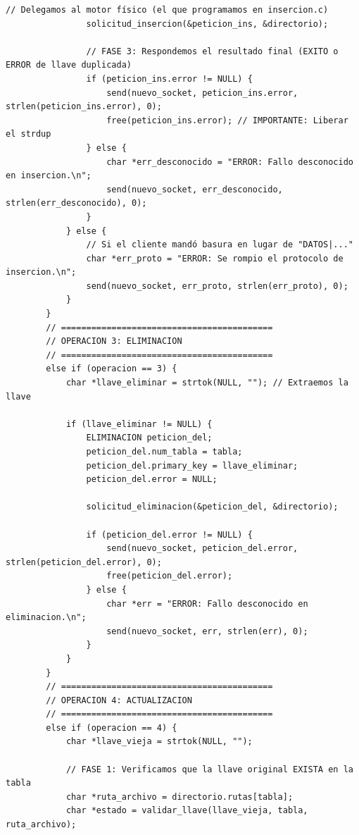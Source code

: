 \documentclass[12pt]{article}
\begin{document}
\begin{lstlisting}[style=estiloC ,title={Código 1. Servidor TCP (MAIN)}]
                // Delegamos al motor físico (el que programamos en insercion.c)
                solicitud_insercion(&peticion_ins, &directorio);

                // FASE 3: Respondemos el resultado final (EXITO o ERROR de llave duplicada)
                if (peticion_ins.error != NULL) {
                    send(nuevo_socket, peticion_ins.error, strlen(peticion_ins.error), 0);
                    free(peticion_ins.error); // IMPORTANTE: Liberar el strdup
                } else {
                    char *err_desconocido = "ERROR: Fallo desconocido en insercion.\n";
                    send(nuevo_socket, err_desconocido, strlen(err_desconocido), 0);
                }
            } else {
                // Si el cliente mandó basura en lugar de "DATOS|..."
                char *err_proto = "ERROR: Se rompio el protocolo de insercion.\n";
                send(nuevo_socket, err_proto, strlen(err_proto), 0);
            }
        }
        // ==========================================
        // OPERACION 3: ELIMINACION
        // ==========================================
        else if (operacion == 3) {
            char *llave_eliminar = strtok(NULL, ""); // Extraemos la llave
            
            if (llave_eliminar != NULL) {
                ELIMINACION peticion_del;
                peticion_del.num_tabla = tabla;
                peticion_del.primary_key = llave_eliminar;
                peticion_del.error = NULL;

                solicitud_eliminacion(&peticion_del, &directorio);

                if (peticion_del.error != NULL) {
                    send(nuevo_socket, peticion_del.error, strlen(peticion_del.error), 0);
                    free(peticion_del.error);
                } else {
                    char *err = "ERROR: Fallo desconocido en eliminacion.\n";
                    send(nuevo_socket, err, strlen(err), 0);
                }
            }
        }
        // ==========================================
        // OPERACION 4: ACTUALIZACION
        // ==========================================
        else if (operacion == 4) {
            char *llave_vieja = strtok(NULL, ""); 
            
            // FASE 1: Verificamos que la llave original EXISTA en la tabla
            char *ruta_archivo = directorio.rutas[tabla];
            char *estado = validar_llave(llave_vieja, tabla, ruta_archivo);
            

\end{lstlisting}
\end{document}
